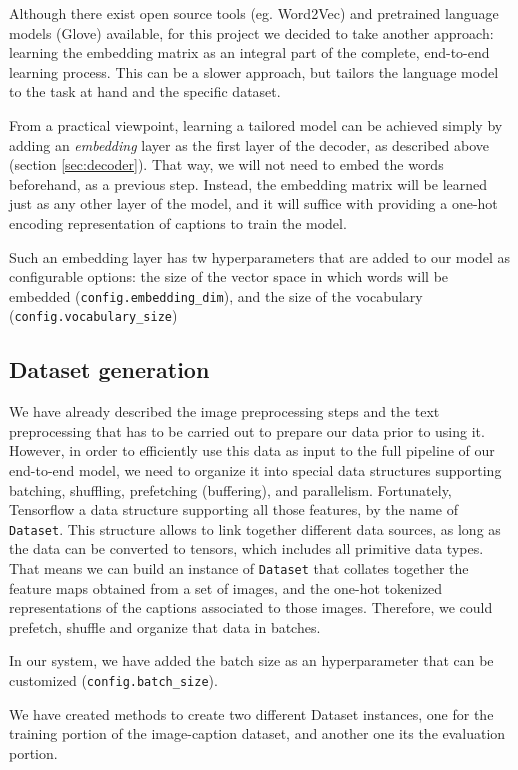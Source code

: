 Although there exist open source tools (eg. Word2Vec) and pretrained language models (Glove) available, for this project we decided to take another approach: learning the embedding matrix as an integral part of the complete, end-to-end learning process. This can be a slower approach, but tailors the language model to the task at hand and the specific dataset. 

From a practical viewpoint, learning a tailored model can be achieved simply by adding an \textit{embedding} layer as the first layer of the decoder, as described above (section \cref{sec:decoder}). That way, we will not need to embed the words beforehand, as a previous step. Instead, the embedding matrix will be learned just as any other layer of the model, and it will suffice with providing a one-hot encoding representation of captions to train the model.

Such an embedding layer has tw hyperparameters that are added to our model as configurable options: the size of the vector space in which words will be embedded (\lstinline{config.embedding_dim}), and the size of the vocabulary (\lstinline{config.vocabulary_size})

\subsection{Dataset generation}

We have already described the image preprocessing steps and the text preprocessing that has to be carried out to prepare our data prior to using it. However, in order to efficiently use this data as input to the full pipeline of our end-to-end model, we need to organize it into special data structures supporting batching, shuffling, prefetching (buffering), and parallelism. Fortunately, Tensorflow a data structure supporting all those features, by the name of \lstinline{Dataset}. This structure allows to link together different data sources, as long as the data can be converted to tensors, which includes all primitive data types. That means we can build an instance of \lstinline{Dataset} that collates together the feature maps obtained from a set of images, and the one-hot tokenized representations of the captions associated to those images. Therefore, we could prefetch, shuffle and organize that data in batches.

In our system, we have added the batch size as an hyperparameter that can be customized (\lstinline{config.batch_size}). 

We have created methods to create two different Dataset instances, one for the training portion of the image-caption dataset, and another one its the evaluation portion.

